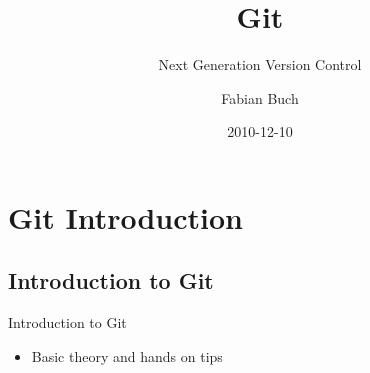\documentclass{beamer}
\title[] %
{Git}
\subtitle
{Next Generation Version Control}
\author[] %
{Fabian Buch}
\institute[] %
{Synyx GmbH \& Co. KG}
\date[] %
{2010-12-10}
\begin{document}



\begin{frame}
  \titlepage
\end{frame}







\section{Git Introduction}

\subsection{Introduction to Git}\label{sub:einleitung}




\begin{frame}{Introduction to Git}
  \begin{itemize}
  \item
    Basic theory and hands on tips
  \end{itemize}
\end{frame}
\end{document}
